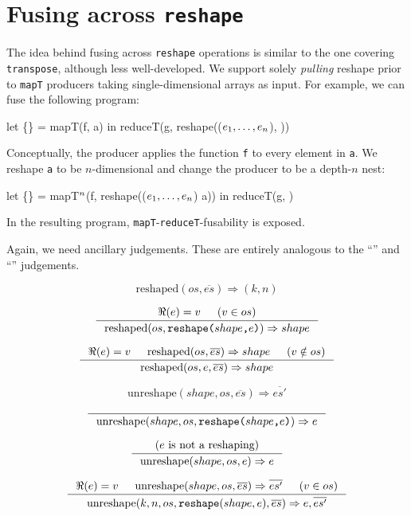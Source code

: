 \section{Fusing across \texttt{reshape}}

The idea behind fusing across \texttt{reshape} operations is similar
to the one covering \texttt{transpose}, although less well-developed.
We support solely \textit{pulling} reshape prior to \texttt{mapT}
producers taking single-dimensional arrays as input.  For example, we
can fuse the following program:

\begin{colorcode}
let \{\} = mapT(f, a) in 
reduceT(g, reshape((\(e_{1}, \ldots, e_{n}\)), ))
\end{colorcode}

Conceptually, the producer applies the function \texttt{f} to every
element in \texttt{a}.  We reshape \texttt{a} to be $n$-dimensional
and change the producer to be a depth-$n$ nest:

\begin{colorcode}
let \{\} = mapT\(^{n}\)(f, reshape((\(e_{1}, \ldots, e_{n}\)) a)) in
reduceT(g, )
\end{colorcode}

In the resulting program, \texttt{mapT}-\texttt{reduceT}-fusability is
exposed.

Again, we need ancillary judgements.  These are entirely analogous to
the ``'' and ``'' judgements.

\[
\boxed{
  \text{reshaped}(os,\overline{es}) \Rightarrow (k,n)
}
\]

\[
\inference{
  \Re(e) = v
  &
  (v \in os)
}{
  \text{reshaped}(os,\texttt{reshape($shape$,$e$)}) \Rightarrow shape
}
\]

\[
\inference{
  \Re(e) = v
  &
  \text{reshaped}(os,\overline{es}) \Rightarrow shape
  &
  (v \notin os)
}{
  \text{reshaped}(os, e, \overline{es}) \Rightarrow shape
}
\]

\[
\boxed{
  \text{unreshape}(shape, os, \overline{es}) \Rightarrow \overline{es'}
}
\]

\[
\inference{
}{
  \text{unreshape}(shape, os,\texttt{reshape($shape$,$e$)}) \Rightarrow e
}
\]

\[
\inference{
  (\text{$e$ is not a reshaping})
}{
  \text{unreshape}(shape, os, e) \Rightarrow e
}
\]

\[
\inference{
  \Re(e) = v
  &
  \text{unreshape}(shape, os, \overline{es}) \Rightarrow \overline{es'}
  &
  (v \in os)
}{
  \text{unreshape}(k, n, os, \texttt{reshape}(shape, e), \overline{es}) \Rightarrow e, \overline{es'}
}
\]

